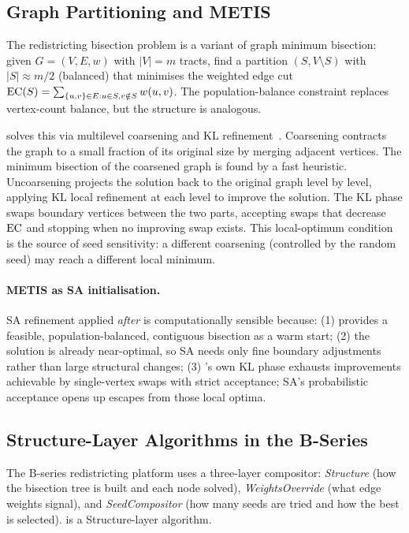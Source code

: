 \subsection{Graph Partitioning and METIS}

The redistricting bisection problem is a variant of graph minimum bisection:
given $G = (V, E, w)$ with $|V| = m$ tracts, find a partition
$(S, V \setminus S)$ with $|S| \approx m/2$ (balanced) that minimises the
weighted edge cut $\mathrm{EC}(S) = \sum_{\{u,v\} \in E: u \in S, v \notin S} w(u,v)$.
The population-balance constraint replaces vertex-count balance, but the
structure is analogous.

\metis{} solves this via multilevel coarsening and KL refinement~\citep{karypis1998}.
Coarsening contracts the graph to a small fraction of its original size by
merging adjacent vertices.
The minimum bisection of the coarsened graph is found by a fast heuristic.
Uncoarsening projects the solution back to the original graph level by level,
applying KL local refinement at each level to improve the solution.
The KL phase swaps boundary vertices between the two parts, accepting swaps
that decrease $\mathrm{EC}$ and stopping when no improving swap exists.
This local-optimum condition is the source of seed sensitivity: a different
coarsening (controlled by the random seed) may reach a different local minimum.

\paragraph{METIS as SA initialisation.}
SA refinement applied \emph{after} \metis{} is computationally sensible
because:
(1) \metis{} provides a feasible, population-balanced, contiguous bisection
    as a warm start;
(2) the \metis{} solution is already near-optimal, so SA needs only fine
    boundary adjustments rather than large structural changes;
(3) \metis{}'s own KL phase exhausts improvements achievable by single-vertex
    swaps with strict acceptance; SA's probabilistic acceptance opens up
    escapes from those local optima.

\subsection{Structure-Layer Algorithms in the B-Series}

The B-series redistricting platform uses a three-layer compositor:
\emph{Structure} (how the bisection tree is built and each node solved),
\emph{WeightsOverride} (what edge weights signal), and
\emph{SeedCompositor} (how many seeds are tried and how the best is selected).
\sa{} is a Structure-layer algorithm.

